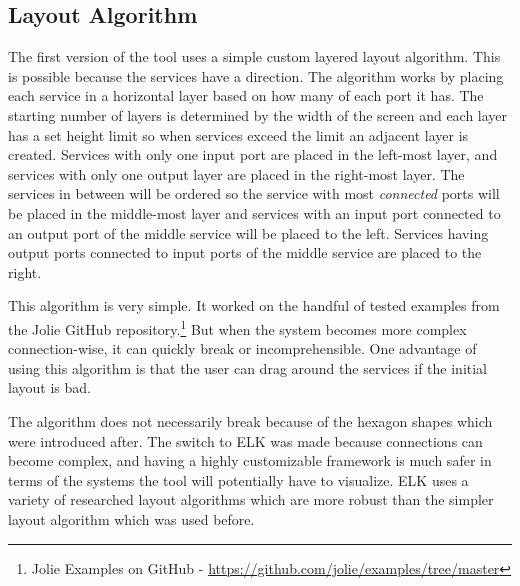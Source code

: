 \subsection{Layout Algorithm}
The first version of the tool uses a simple custom layered layout algorithm. This is possible because the services have a direction.
The algorithm works by placing each service in a horizontal layer based on how many of each port it has. The starting number of layers is determined by the width of the screen and each layer has a set height limit so when services exceed the limit an adjacent layer is created.
Services with only one input port are placed in the left-most layer, and services with only one output layer are placed in the right-most layer.
The services in between will be ordered so the service with most \emph{connected} ports will be placed in the middle-most layer and services with an input port connected to an output port of the middle service will be placed to the left. Services having output ports connected to input ports of the middle service are placed to the right.

This algorithm is very simple. It worked on the handful of tested examples from the Jolie GitHub repository.\footnote{Jolie Examples on GitHub - \url{https://github.com/jolie/examples/tree/master}}
But when the system becomes more complex connection-wise, it can quickly break or incomprehensible. One advantage of using this algorithm is that the user can drag around the services if the initial layout is bad.

The algorithm does not necessarily break because of the hexagon shapes which were introduced after. The switch to ELK was made because connections can become complex, and having a highly customizable framework is much safer in terms of the systems the tool will potentially have to visualize.
ELK uses a variety of researched layout algorithms which are more robust than the simpler layout algorithm which was used before.

